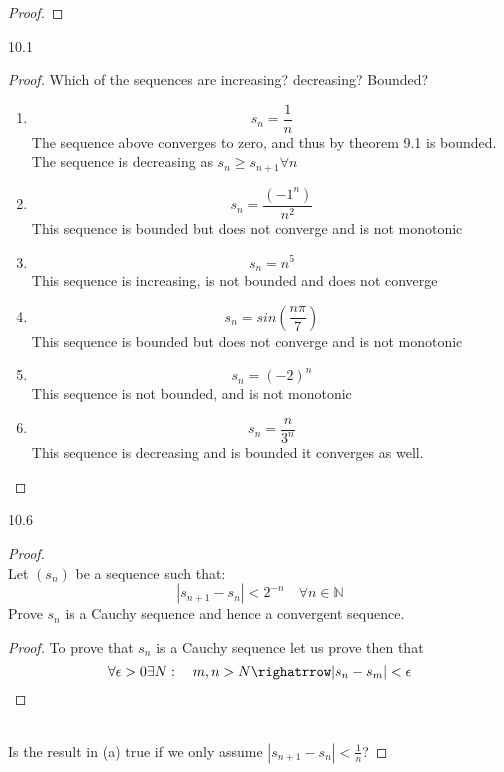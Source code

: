 \documentclass[11pt]{article}
\theoremstyle{definition}  %
\newcommand{\nlim}{\lim_{n\rightarrow \infty}}
\begin{document}
\begin{enumerate}
\begin{proof}
\begin{enumerate}
      \item
      \textbf{What is  $\nlim(\sum_{k=0}^na^k), a\geq 1}$}
      \begin{align*}
        &\nlim \left(\frac{1}{1-a}-\frac{a^{n+1}}{{1-a}}\right)\\
        &\left(\frac{1}{1-a}-\frac{\nlim a^{n+1}}{{1-a}}\right)\\
        &\left(\frac{1}{1-a}-\frac{\infty}{{1-a}}\right)=\infty\\
      \end{align*}
    \end{enumerate}
  \end{proof}
  \item 10.1
  \begin{proof}
    Which of the sequences are increasing? decreasing? Bounded?
    \begin{enumerate}
      \item
      \[
        s_n=\frac{1}{n}
      \]
      The sequence above converges to zero, and thus by theorem 9.1 is bounded. The sequence is decreasing as $s_n \geq s_{n+1} \forall n$
      \item
      \[
        s_n=\frac{(-1^n)}{n^2}
      \]
      This sequence is bounded but does not converge and is not monotonic
      \item
      \[
        s_n=n^5
      \]
      This sequence is increasing, is not bounded and does not converge
      \item
      \[
        s_n=sin(\frac{n\pi}{7})
      \]
      This sequence is bounded but does not converge and is not monotonic
      \item
      \[
        s_n=(-2)^n
      \]
      This sequence is not bounded, and is not monotonic
      \item
      \[
        s_n=\frac{n}{3^n}
      \]
      This sequence is decreasing and is bounded it converges as well.
    \end{enumerate}
  \end{proof}
  \item 10.6
  \begin{proof}
    \item\\
    Let $(s_n)$ be a sequence such that:
    \[
      |s_{n+1}-s_n|<2^{-n} \quad \forall n\in \mathbb{N}
    \]
    Prove $s_n$ is a Cauchy sequence and hence a convergent sequence.
    \begin{proof}
    To prove that $s_n$ is a Cauchy sequence let us prove then that \[
      \forall \epsilon>0 \exists N: \quad m,n>N \righatrrow |s_n-s_m|<\epsilon
    \]
    \end{proof}
    \item\\
    Is the result in (a) true if we only assume $|s_{n+1}-s_n|<\frac{1}{n}$?
  \end{proof}
\end{enumerate}
\end{document}
